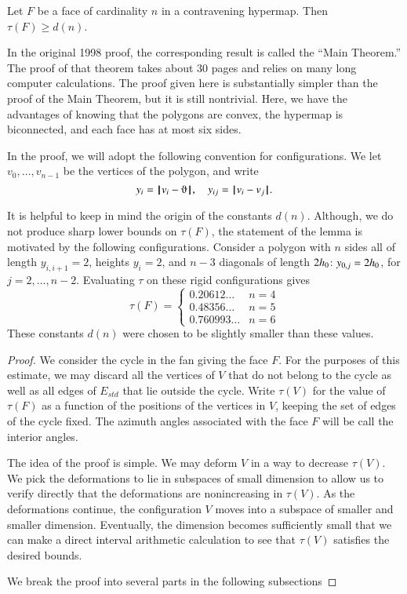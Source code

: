 \label{sec:admissibility}



\begin{lemma}  Let $F$ be a face of cardinality $n$ in a contravening hypermap.  Then
        $\tau(F) \ge d(n)$.
\end{lemma}

In the original 1998 proof, the corresponding result
is called the ``Main Theorem.''  The proof of that 
theorem takes about 30 pages and relies on many
long computer calculations.  The proof given here
is substantially simpler than the proof of the
Main Theorem, but
it is still nontrivial.  Here, we have the advantages
of knowing that the polygons are convex, the hypermap
is biconnected, and each face has at most six sides.

In the proof, we will adopt the following convention for
configurations.  We let $v_0,\ldots,v_{n-1}$ be the vertices
of the polygon, and write
$$
y_i = \norm{v_i}{\orgn},\quad y_{ij} = \norm{v_i}{ v_j}.
$$

It is helpful to keep in mind the origin of the constants $d(n)$.
Although, we do not produce sharp lower bounds on $\tau(F)$, the
statement of the lemma is motivated by the following configurations.
Consider a polygon with $n$ sides all of length $y_{i,i+1}=2$, heights
$y_i=2$, and $n-3$ diagonals of length $2{h_0}$: $y_{0,j}=2{h_0}$, for
$j=2,\ldots,n-2$.  Evaluating $\tau$ on these rigid configurations gives
$$
\tau(F) = \begin{cases}
0.20612\ldots & n=4\\
0.48356\ldots & n=5\\
0.760993\ldots &n=6
\end{cases}
$$
These constants $d(n)$ were chosen to be slightly smaller than these values.


\begin{proof}  We consider the cycle in the fan
giving the face $F$.  For the purposes of this
estimate, we may discard all the vertices of $V$
that do not belong to the cycle as well as all edges
of $E_{std}$ that lie outside the cycle.
Write $\tau(V)$ for the value of $\tau(F)$ as a
function of the positions of the vertices in $V$,
keeping the set of edges of the cycle fixed.  The
azimuth angles associated with the face $F$ will be
call the interior angles.  

The idea of the proof is simple.  We may deform $V$ in a way to decrease $\tau(V)$.  We pick the deformations to lie in subspaces of small dimension to allow us to verify directly that the deformations are nonincreasing in $\tau(V)$.  As the deformations continue, the configuration $V$ moves into a subspace of smaller and smaller dimension.  Eventually, the dimension becomes sufficiently small that we can make a direct interval arithmetic calculation to see that $\tau(V)$ satisfies the desired bounds.

We break the proof into several parts in the following
subsections
\end{proof}


